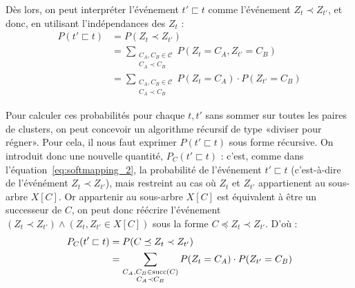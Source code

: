 Dès lors, on peut interpréter l'événement $t' \sqsubset t$ comme l'événement $Z_t \prec Z_{t'}$, et donc, en utilisant l'indépendances des $Z_t$ : 
\begin{align}
    \label{eq:softmapping_2}
    P(t' \sqsubset t) &= P(Z_t \prec Z_{t'}) \\
    &= \sum_{\substack{C_A, C_B \in \mathcal{C} \\ C_A \prec C_B}} P(Z_{t }= C_A, Z_{t'} = C_B) \nonumber \\
    &= \sum_{\substack{C_A, C_B \in \mathcal{C} \\ C_A \prec C_B}} P(Z_{t }= C_A)\cdot P(Z_{t'} = C_B)
\end{align}

Pour calculer ces probabilités pour chaque $t, t'$ sans sommer sur toutes les paires de clusters, on peut concevoir un algorithme récursif de type «diviser pour régner». Pour cela, il nous faut exprimer $P(t' \sqsubset t)$ sous forme récursive. On introduit donc une nouvelle quantité,  $P_C(t' \sqsubset t)$ : c'est, comme dans l'équation~\ref{eq:softmapping_2}, la probabilité de l'événement $t' \sqsubset t$ (c'est-à-dire de l'événément $Z_t \prec Z_{t'}$), mais restreint au cas où $Z_t$ et $Z_{t'}$ appartienent au sous-arbre $X[C]$. Or appartenir au sous-arbre $X[C]$ est équivalent à être un successeur de $C$, on peut donc réécrire l'événement $(Z_t \prec Z_{t'}) \land (Z_t, Z_{t'} \in X[C])$ sous la forme $C \preceq Z_t \prec Z_{t'}$. D'où :
\begin{align}
    P_C(t' \sqsubset t) &= P(C \preceq Z_t \prec Z_{t'}) \nonumber \\
    &= \sum_{\substack{C_A, C_B \in \operatorname{succ}(C) \\  C_A \prec C_B}} P(Z_t = C_A)\cdot P(Z_{t'} = C_B) \label{eq:proba_subsumption}
\end{align}



